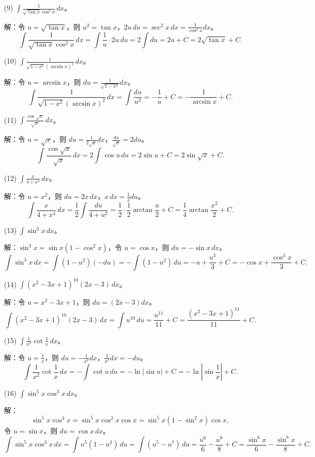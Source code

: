 (9) \(\int\frac{1}{\sqrt{\tan x}\cos^{2}x}\,dx\)。

解：令 \(u=\sqrt{\tan x}\)，则 \(u^{2}=\tan x\)，\(2u\,du=\sec^{2}x\,dx=\frac{1}{\cos^{2}x}dx\)。
\[ \int\frac{1}{\sqrt{\tan x}\cos^{2}x}\,dx=\int\frac{1}{u}\cdot 2u\,du=2\int du=2u+C=2\sqrt{\tan x}+C. \]

(10) \(\int\frac{1}{\sqrt{1-x^{2}}(\arcsin x)^{2}}\,dx\)。

解：令 \(u=\arcsin x\)，则 \(du=\frac{1}{\sqrt{1-x^{2}}}dx\)。
\[ \int\frac{1}{\sqrt{1-x^{2}}(\arcsin x)^{2}}\,dx=\int\frac{du}{u^{2}}=-\frac{1}{u}+C=-\frac{1}{\arcsin x}+C. \]

(11) \(\int\frac{\cos\sqrt{x}}{\sqrt{x}}\,dx\)。

解：令 \(u=\sqrt{x}\)，则 \(du=\frac{1}{2\sqrt{x}}dx\)，\(\frac{dx}{\sqrt{x}}=2du\)。
\[ \int\frac{\cos\sqrt{x}}{\sqrt{x}}\,dx=2\int\cos u\,du=2\sin u+C=2\sin\sqrt{x}+C. \]

(12) \(\int\frac{x}{4+x^{4}}\,dx\)。

解：令 \(u=x^{2}\)，则 \(du=2x\,dx\)，\(x\,dx=\frac{1}{2}du\)。
\[ \int\frac{x}{4+x^{4}}\,dx=\frac{1}{2}\int\frac{du}{4+u^{2}}=\frac{1}{2}\cdot\frac{1}{2}\arctan\frac{u}{2}+C=\frac{1}{4}\arctan\frac{x^{2}}{2}+C. \]

(13) \(\int\sin^{3}x\,dx\)。

解：\(\sin^{3}x=\sin x(1-\cos^{2}x)\)，令 \(u=\cos x\)，则 \(du=-\sin x\,dx\)。
\[ \int\sin^{3}x\,dx=\int(1-u^{2})(-du)=-\int(1-u^{2})\,du=-u+\frac{u^{3}}{3}+C=-\cos x+\frac{\cos^{3}x}{3}+C. \]

(14) \(\int(x^{2}-3x+1)^{10}(2x-3)\,dx\)。

解：令 \(u=x^{2}-3x+1\)，则 \(du=(2x-3)dx\)。
\[ \int(x^{2}-3x+1)^{10}(2x-3)\,dx=\int u^{10}\,du=\frac{u^{11}}{11}+C=\frac{(x^{2}-3x+1)^{11}}{11}+C. \]

(15) \(\int\frac{1}{x^{2}}\cot\frac{1}{x}\,dx\)。

解：令 \(u=\frac{1}{x}\)，则 \(du=-\frac{1}{x^{2}}dx\)，\(\frac{1}{x^{2}}dx=-du\)。
\[ \int\frac{1}{x^{2}}\cot\frac{1}{x}\,dx=-\int\cot u\,du=-\ln|\sin u|+C=-\ln\left|\sin\frac{1}{x}\right|+C. \]

(16) \(\int\sin^{5}x\cos^{3}x\,dx\)。

解：
\[ \sin^{5}x\cos^{3}x=\sin^{5}x\cos^{2}x\cos x=\sin^{5}x(1-\sin^{2}x)\cos x, \]
令 \(u=\sin x\)，则 \(du=\cos x\,dx\)。
\[ \int\sin^{5}x\cos^{3}x\,dx=\int u^{5}(1-u^{2})\,du=\int(u^{5}-u^{7})\,du=\frac{u^{6}}{6}-\frac{u^{8}}{8}+C=\frac{\sin^{6}x}{6}-\frac{\sin^{8}x}{8}+C. \]

